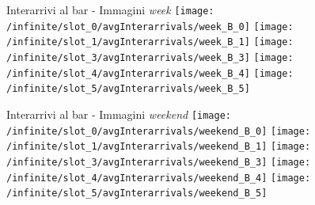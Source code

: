 \documentclass[xcolor=table]{beamer}
\begin{document}
\begin{frame}{Interarrivi al bar - Immagini \textit{week}}\justifying
\centering
\texttt{[image: /infinite/slot\_0/avgInterarrivals/week\_B\_0]}
\texttt{[image: /infinite/slot\_1/avgInterarrivals/week\_B\_1]}
\texttt{[image: /infinite/slot\_3/avgInterarrivals/week\_B\_3]}
\texttt{[image: /infinite/slot\_4/avgInterarrivals/week\_B\_4]}
\texttt{[image: /infinite/slot\_5/avgInterarrivals/week\_B\_5]}
\end{frame}


\begin{frame}{Interarrivi al bar - Immagini \textit{weekend}}\justifying
\centering
\texttt{[image: /infinite/slot\_0/avgInterarrivals/weekend\_B\_0]}
\texttt{[image: /infinite/slot\_1/avgInterarrivals/weekend\_B\_1]}
\texttt{[image: /infinite/slot\_3/avgInterarrivals/weekend\_B\_3]}
\texttt{[image: /infinite/slot\_4/avgInterarrivals/weekend\_B\_4]}
\texttt{[image: /infinite/slot\_5/avgInterarrivals/weekend\_B\_5]}
\end{frame}
\end{document}
